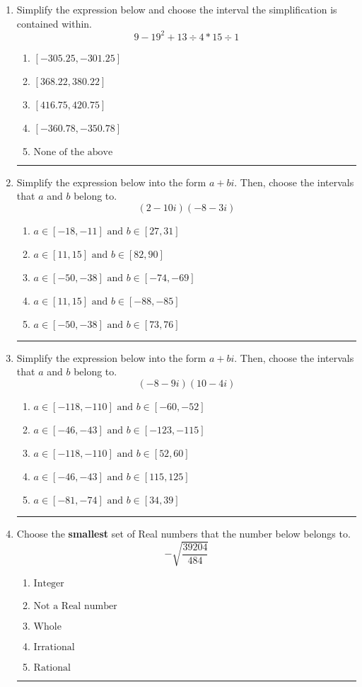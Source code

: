 \documentclass[14pt]{extbook}
\newcommand{\litem}[1]{\item#1\hspace*{-1cm}\rule{\textwidth}{0.4pt}}
\begin{document}
\begin{enumerate}
{\begin{enumerate}[label=\Alph*.]
\end{enumerate} }
\litem{
Simplify the expression below and choose the interval the simplification is contained within.\[ 9 - 19^2 + 13 \div 4 * 15 \div 1 \]\begin{enumerate}[label=\Alph*.]
\item \( [-305.25, -301.25] \)
\item \( [368.22, 380.22] \)
\item \( [416.75, 420.75] \)
\item \( [-360.78, -350.78] \)
\item \( \text{None of the above} \)

\end{enumerate} }
\litem{
Simplify the expression below into the form $a+bi$. Then, choose the intervals that $a$ and $b$ belong to.\[ (2 - 10 i)(-8 - 3 i) \]\begin{enumerate}[label=\Alph*.]
\item \( a \in [-18, -11] \text{ and } b \in [27, 31] \)
\item \( a \in [11, 15] \text{ and } b \in [82, 90] \)
\item \( a \in [-50, -38] \text{ and } b \in [-74, -69] \)
\item \( a \in [11, 15] \text{ and } b \in [-88, -85] \)
\item \( a \in [-50, -38] \text{ and } b \in [73, 76] \)

\end{enumerate} }
\litem{
Simplify the expression below into the form $a+bi$. Then, choose the intervals that $a$ and $b$ belong to.\[ (-8 - 9 i)(10 - 4 i) \]\begin{enumerate}[label=\Alph*.]
\item \( a \in [-118, -110] \text{ and } b \in [-60, -52] \)
\item \( a \in [-46, -43] \text{ and } b \in [-123, -115] \)
\item \( a \in [-118, -110] \text{ and } b \in [52, 60] \)
\item \( a \in [-46, -43] \text{ and } b \in [115, 125] \)
\item \( a \in [-81, -74] \text{ and } b \in [34, 39] \)

\end{enumerate} }
\litem{
Choose the \textbf{smallest} set of Real numbers that the number below belongs to.\[ -\sqrt{\frac{39204}{484}} \]\begin{enumerate}[label=\Alph*.]
\item \( \text{Integer} \)
\item \( \text{Not a Real number} \)
\item \( \text{Whole} \)
\item \( \text{Irrational} \)
\item \( \text{Rational} \)


\end{enumerate}}
\end{enumerate}
\end{document}
